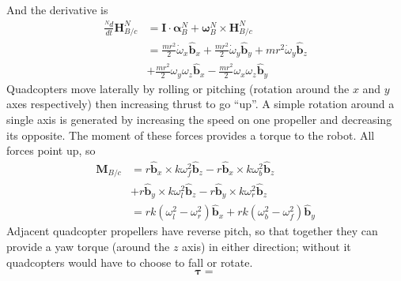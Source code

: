\documentclass[lettersize,journal]{IEEEtran}
\begin{document}
And the derivative is
\begin{align}
	\frac{^Nd}{dt}\mathbf{H}^N_{B/c} &= \mathbf{I}\cdot\boldsymbol\alpha^N_B + \boldsymbol\omega^N_B \times \mathbf{H}^N_{B/c} \nonumber\\
	&= \frac{mr^2}{2}\dot\omega_x \mathbf{\hat{b}}_x + \frac{mr^2}{2}\dot\omega_y \mathbf{\hat{b}}_y + mr^2\dot\omega_y \mathbf{\hat{b}}_z \nonumber \\ 
	&+\frac{mr^2}{2}\omega_y \omega_z \mathbf{\hat{b}}_x - \frac{mr^2}{2} \omega_x\omega_z \mathbf{\hat{b}}_y
\end{align}
Quadcopters move laterally by rolling or pitching (rotation around the $x$ and $y$ axes respectively) then increasing thrust to go ``up''. A simple rotation around a single axis is generated by increasing the speed on one propeller and decreasing its opposite. The moment of these forces provides a torque to the robot. All forces point up, so
\begin{align}
	\mathbf{M}_{B/c} &= r \mathbf{\hat{b}}_x \times k\omega_f^2 \mathbf{\hat{b}}_z - r\mathbf{\hat{b}}_x \times k\omega_b^2 \mathbf{\hat{b}}_z \nonumber \\
	&+ r\mathbf{\hat{b}}_y\times k\omega_l^2 \mathbf{\hat{b}}_z  - r\mathbf{\hat{b}}_y \times k\omega_r^2 \mathbf{\hat{b}}_z\\
	&= rk \left(\omega_l^2-\omega_r^2\right) \mathbf{\hat{b}}_x+ rk\left(\omega_b^2-\omega_f^2\right) \mathbf{\hat{b}}_y
\end{align}
Adjacent quadcopter propellers have reverse pitch, so that together they can provide a yaw torque (around the $z$ axis) in either direction; without it quadcopters would have to choose to fall or rotate.
\begin{equation}
	\boldsymbol\tau = 
\end{equation}
\end{document}
